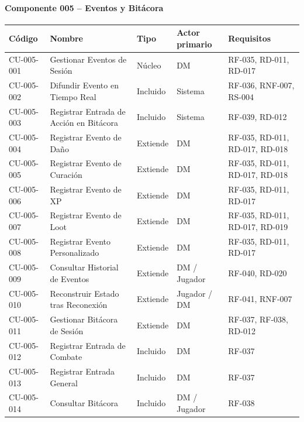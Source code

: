 \paragraph{Componente 005 -- Eventos y Bitácora}
{\footnotesize\setlength{\tabcolsep}{4pt}\renewcommand{\arraystretch}{1.15}
\begin{longtable}{|>{\raggedright\arraybackslash}p{1.9cm}|>{\raggedright\arraybackslash}p{4.4cm}|>{\raggedright\arraybackslash}p{1.7cm}|>{\raggedright\arraybackslash}p{2.5cm}|>{\raggedright\arraybackslash}p{4.0cm}|}
\hline
\textbf{Código} & \textbf{Nombre} & \textbf{Tipo} & \textbf{Actor primario} & \textbf{Requisitos} \\ \hline\endhead
CU-005-001 & Gestionar Eventos de Sesión & Núcleo & DM & RF-035, RD-011, RD-017 \\ \hline
CU-005-002 & Difundir Evento en Tiempo Real & Incluido & Sistema & RF-036, RNF-007, RS-004 \\ \hline
CU-005-003 & Registrar Entrada de Acción en Bitácora & Incluido & Sistema & RF-039, RD-012 \\ \hline
CU-005-004 & Registrar Evento de Daño & Extiende & DM & RF-035, RD-011, RD-017, RD-018 \\ \hline
CU-005-005 & Registrar Evento de Curación & Extiende & DM & RF-035, RD-011, RD-017, RD-018 \\ \hline
CU-005-006 & Registrar Evento de XP & Extiende & DM & RF-035, RD-011, RD-017 \\ \hline
CU-005-007 & Registrar Evento de Loot & Extiende & DM & RF-035, RD-011, RD-017, RD-019 \\ \hline
CU-005-008 & Registrar Evento Personalizado & Extiende & DM & RF-035, RD-011, RD-017 \\ \hline
CU-005-009 & Consultar Historial de Eventos & Extiende & DM / Jugador & RF-040, RD-020 \\ \hline
CU-005-010 & Reconstruir Estado tras Reconexión & Extiende & Jugador / DM & RF-041, RNF-007 \\ \hline
CU-005-011 & Gestionar Bitácora de Sesión & Extiende & DM & RF-037, RF-038, RD-012 \\ \hline
CU-005-012 & Registrar Entrada de Combate & Incluido & DM & RF-037 \\ \hline
CU-005-013 & Registrar Entrada General & Incluido & DM & RF-037 \\ \hline
CU-005-014 & Consultar Bitácora & Incluido & DM / Jugador & RF-038 \\ \hline
\end{longtable}}
